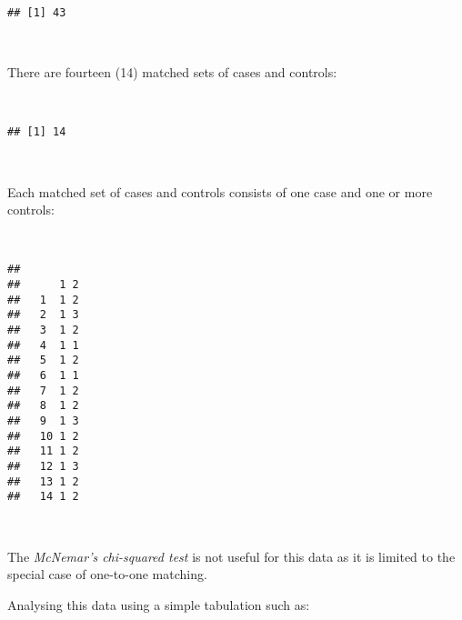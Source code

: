 \documentclass[
  12pt,
  a4paper]{book}
\newenvironment{Shaded}{\begin{snugshade}}{\end{snugshade}}
\newcommand{\FunctionTok}[1]{\textcolor[rgb]{0.00,0.00,0.00}{#1}}
\newcommand{\NormalTok}[1]{#1}
\newcommand{\SpecialCharTok}[1]{\textcolor[rgb]{0.00,0.00,0.00}{#1}}
\begin{document}
\begin{verbatim}
## [1] 43
\end{verbatim}

~

There are fourteen (14) matched sets of cases and controls:

~

\begin{Shaded}
\end{Shaded}

\begin{verbatim}
## [1] 14
\end{verbatim}

~

Each matched set of cases and controls consists of one case and one or more controls:

~

\begin{Shaded}
\end{Shaded}

\begin{verbatim}
##     
##      1 2
##   1  1 2
##   2  1 3
##   3  1 2
##   4  1 1
##   5  1 2
##   6  1 1
##   7  1 2
##   8  1 2
##   9  1 3
##   10 1 2
##   11 1 2
##   12 1 3
##   13 1 2
##   14 1 2
\end{verbatim}

~

The \emph{McNemar's chi-squared test} is not useful for this data as it is limited to the special case of one-to-one matching.

Analysing this data using a simple tabulation such as:

~

\begin{Shaded}
\end{Shaded}
\end{document}
